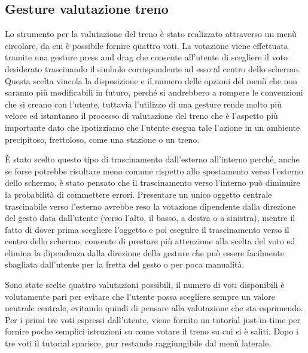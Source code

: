 \subsection{Gesture valutazione treno}
Lo strumento per la valutazione del treno è stato realizzato attraverso un menù circolare, da cui è possibile fornire quattro voti. La votazione viene effettuata tramite una gesture press and drag che consente all'utente di scegliere il voto desiderato trascinando il simbolo corrispondente ad esso al centro dello schermo. 
Questa scelta vincola la disposizione e il numero delle opzioni del menù che non saranno più modificabili in futuro, perché si andrebbero a rompere le convenzioni che si creano con l'utente, tuttavia l'utilizzo di una gesture rende molto più veloce ed istantaneo il processo di valutazione del treno che è l'aspetto più importante dato che ipotizziamo che l'utente esegua tale l'azione in un ambiente precipitoso, frettoloso, come una stazione o un treno.   

È stato scelto questo tipo di trascinamento dall'esterno all'interno perché, anche se forse potrebbe risultare meno comune rispetto allo spostamento verso l'esterno dello schermo, è stato pensato che il trascinamento verso l'interno può diminuire la probabilità di commettere errori. Presentare un unico oggetto centrale trascinabile verso l'esterno avrebbe reso la votazione dipendente dalla direzione del gesto data dall'utente (verso l'alto, il basso, a destra o a sinistra), mentre il fatto di dover prima scegliere l'oggetto e poi eseguire il trascinamento verso il centro dello schermo, consente di prestare più attenzione alla scelta del voto ed elimina la dipendenza dalla direzione della gesture che può essere facilmente sbagliata dall'utente per la fretta del gesto o per poca manualità. 

Sono state scelte quattro valutazioni possibili, il numero di voti disponibili è volutamente pari per evitare che l'utente possa scegliere sempre un valore neutrale centrale, evitando quindi di pensare alla valutazione che sta esprimendo. 
Per i primi tre voti espressi dall'utente, viene fornito un tutorial just-in-time per fornire poche semplici istruzioni su come votare il treno su cui si è saliti.
Dopo i tre voti il tutorial sparisce, pur restando raggiungibile dal menù laterale.